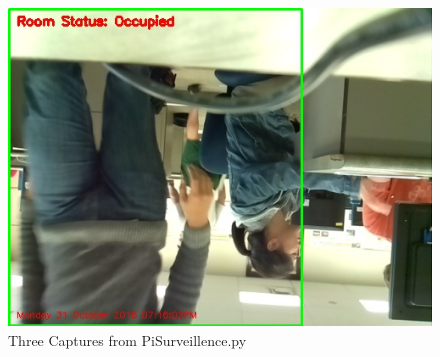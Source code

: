 \begin{figure}[h]
  \includegraphics[width=\linewidth]{images/PiSurv3.jpg}
\endminipage
\caption{Three Captures from PiSurveillence.py}
\end{figure}